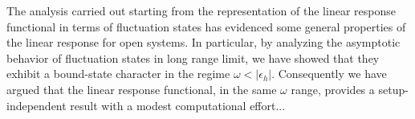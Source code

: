 \documentclass[reprint,aps,prb]{revtex4-1}
\newcommand{\eps}{\epsilon}
\newcommand{\be}{\begin{equation}}
\newcommand{\ee}{\end{equation}}
\newcommand{\lb}{\label}
\newcommand{\op}[1]{\hat {#1}}
\newcommand{\trace}[1]{\mathrm{tr}\left(#1\right)}
\newcommand{\dmnot}{\op{\rho}_0}
\newcommand{\dm}{\op{\rho}}
\newcommand{\hnot}{\op{H}_0}
\begin{document}
The analysis carried out starting from the representation of the linear response functional in terms of fluctuation states has evidenced some general properties of the linear response
for open systems. In particular, by analyzing the asymptotic behavior of fluctuation states in long range limit, we have showed that they exhibit a bound-state character in the regime  
$\omega<|\eps_h|$. Consequently we have argued that the linear response functional, in the same $\omega$ range, provides a setup-independent result with a modest computational effort... 


% 
% 
% 
\end{document}
